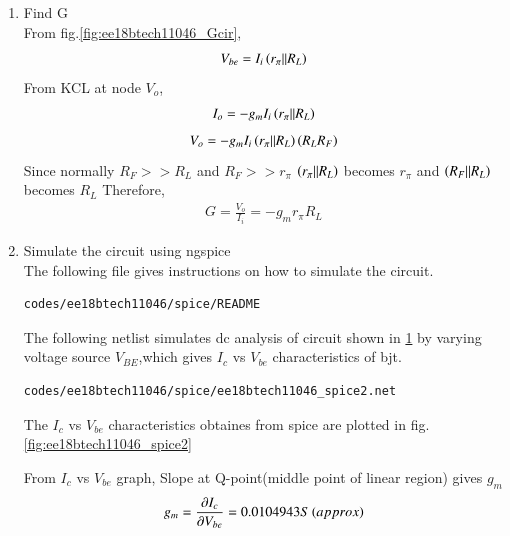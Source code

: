 \begin{enumerate}[label=\arabic*.,ref=\theenumi]
\item Find G
\\
\solution
From fig.\ref{fig:ee18btech11046_Gcir},
\begin{align}
V_{be} = I_{i}\left(r_{\pi}||R_{L}\right)
\end{align}
From KCL at node $V_{o}$,
\begin{align}
I_{o} = -g_{m}I_{i}\left(r_{\pi}||R_{L}\right)
\end{align}
\begin{align}
V_{o} = -g_{m}I_{i}\left(r_{\pi}||R_{L}\right)\left(R_{L}R_{F}\right)
\end{align}
Since normally $R_{F}>>R_{L}$ and $R_{F}>>r_{\pi}$ $\left(r_{\pi}||R_{L}\right)$ becomes $r_{\pi}$ and $\left(R_{F}||R_{L}\right)$ becomes $R_{L}$
Therefore,
\begin{align}
G =\frac{V_{o}}{I_{i}} = -g_{m}r_{\pi}R_{L}
\end{align}

\item Simulate the circuit using ngspice
\\
\solution
The following file gives instructions on how to simulate the circuit.
\begin{lstlisting}
codes/ee18btech11046/spice/README
\end{lstlisting}

%
\begin{figure}[ht!]
	\begin{center}
		\resizebox{\columnwidth}{!}{}
	\end{center}
	\caption{}
	\label{fig:ee18btech11046_spiceCircuit}
\end{figure}
%

The following netlist simulates dc analysis of circuit shown in \ref{fig:ee18btech11046_spiceCircuit} by varying voltage source $V_{BE}$,which gives $I_{c}$ vs $V_{be}$ characteristics of bjt.
\begin{lstlisting}
codes/ee18btech11046/spice/ee18btech11046_spice2.net
\end{lstlisting}

The $I_{c}$ vs $V_{be}$ characteristics obtaines from spice are plotted in fig.\ref{fig:ee18btech11046_spice2}

From $I_{c}$ vs $V_{be}$ graph, Slope at Q-point(middle point of linear region) gives $g_{m}$
\begin{align}
g_{m} = \frac{\partial I_{c}}{\partial V_{be}} = 0.0104943S\left(approx\right)
\end{align}



\end{enumerate}
